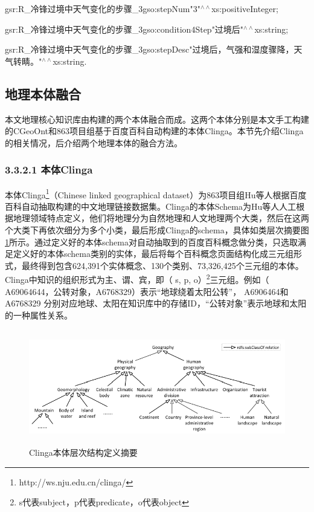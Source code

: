 gsr:R\_冷锋过境中天气变化的步骤\_3\quad gso:stepNum\quad "3"$^{\land\land}$xs:positiveInteger\quad ;

gsr:R\_冷锋过境中天气变化的步骤\_3\quad gso:condition4Step\quad "过境后"$^{\land\land}$xs:string\quad ;

gsr:R\_冷锋过境中天气变化的步骤\_3\quad gso:stepDesc\quad "过境后，气强和湿度骤降，天气转睛。"$^{\land\land}$xs:string\quad .

\subsection{地理本体融合}
本文地理核心知识库由构建的两个本体融合而成。这两个本体分别是本文手工构建的CGeoOnt和863项目组基于百度百科自动构建的本体Clinga。本节先介绍Clinga的相关情况，后介绍两个地理本体的融合方法。

\subsubsection{3.3.2.1 本体Clinga}

本体Clinga\footnote{http://ws.nju.edu.cn/clinga/}（Chinese linked geographical dataset）为863项目组Hu\cite{Hu}等人根据百度百科自动抽取构建的中文地理链接数据集。Clinga的本体Schema为Hu等人人工根据地理领域特点定义，他们将地理分为自然地理和人文地理两个大类，然后在这两个大类下再依次细分为多个小类，最后形成Clinga的schema，具体如类层次摘要图\ref{fig:clinga}所示。通过定义好的本体schema对自动抽取到的百度百科概念做分类，只选取满足定义好的本体schema类别的实体，最后将每个百科概念页面结构化成三元组形式，最终得到包含624,391个实体概念、130个类别、73,326,425个三元组的本体。Clinga中知识的组织形式为主、谓、宾，即（ s, p, o）\footnote{s代表subject，p代表predicate，o代表object}三元组。例如（ A69064644，公转对象，A6768329）表示“地球绕着太阳公转”， A6906464和 A6768329 分别对应地球、太阳在知识库中的存储ID，“公转对象”表示地球和太阳的一种属性关系。

\begin{figure}[!htb]
	\centering\includegraphics[height=5cm]{resource/clinga}
	\caption{Clinga本体层次结构定义摘要}
	\label{fig:clinga}
\end{figure}

